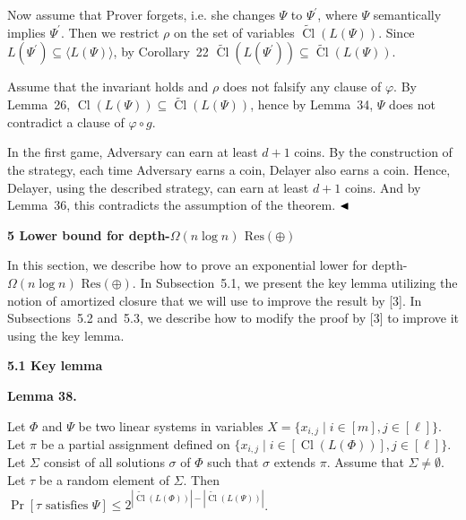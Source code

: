 Now assume that Prover forgets, i.e. she changes $\Psi$ to $\Psi^{\prime}$, where $\Psi$ semantically implies $\Psi^{\prime}$. Then we restrict $\rho$ on the set of variables $\widetilde{\mathop{\mathrm{Cl}}}(L(\Psi))$.
Since $L(\Psi^{\prime})\subseteq\langle L(\Psi)\rangle$, by Corollary 22 $\widetilde{\mathop{\mathrm{Cl}}}(L(\Psi^{\prime}))\subseteq\widetilde{\mathop{\mathrm{Cl}}}(L(\Psi))$.\par



Assume that the invariant holds and $\rho$ does not falsify any clause of $\varphi$. By Lemma 26, $\mathop{\mathrm{Cl}}(L(\Psi))\subseteq\widetilde{\mathop{\mathrm{Cl}}}(L(\Psi))$, hence by Lemma 34, $\Psi$ does not contradict a clause of $\varphi\circ g$.\par



In the first game, Adversary can earn at least $d+1$ coins.
By the construction of the strategy, each time Adversary earns a coin, Delayer also earns a coin. Hence, Delayer, using the described strategy, can earn at least $d+1$ coins. And by Lemma 36, this contradicts the assumption of the theorem.
$\hfill\blacktriangleleft$\par


\par\medskip\noindent\textbf{
5 Lower bound for depth-$\Omega(n\log n)$ $\mathrm{Res}(\oplus)$
}\par


In this section, we describe how to prove an exponential lower for depth-$\Omega(n\log n)$ $\mathrm{Res}(\oplus)$. In Subsection 5.1, we present the key lemma utilizing the notion of amortized closure that we will use to improve the result by [3]. In Subsections 5.2 and 5.3, we describe how to modify the proof by [3] to improve it using the key lemma.\par


\par\medskip\noindent\textbf{
5.1 Key lemma}\par


\par\medskip\noindent\textbf{
Lemma 38.
}\par



Let $\Phi$ and $\Psi$ be two linear systems in variables $X=\{x_{i,j}\mid i\in[m],j\in[\ell]\}$. Let $\pi$ be a partial assignment defined on $\{x_{i,j}\mid i\in[\mathop{\mathrm{Cl}}(L(\Phi))],j\in[\ell]\}$. Let $\Sigma$ consist of all solutions $\sigma$ of $\Phi$ such that $\sigma$ extends $\pi$. Assume that $\Sigma\neq\emptyset$. Let $\tau$ be a random element of $\Sigma$. Then $\Pr[\tau\mbox{ satisfies }\Psi]\leq 2^{|\widetilde{\mathop{\mathrm{Cl}}}(L(\Phi))|-|\widetilde{\mathop{\mathrm{Cl}}}(L(\Psi))|}$.\par



